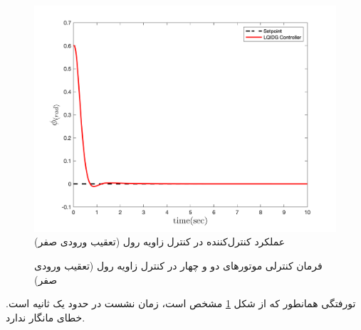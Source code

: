 \begin{figure}[H]
	\includegraphics[width=.48\linewidth]{../Figures/MIL/LQIDG/Roll/lqidg_rollnn_.png}
	\centering
	\caption{عملكرد کنترل‌کننده  در کنترل زاويه رول (تعقیب ورودی صفر)}
	\label{lqidg_roll_fig_simulation}
\end{figure}
\begin{figure}[H]
	\centering
	\caption{‫‪فرمان کنترلی موتورهای دو و چهار در کنترل زاویه رول (تعقیب ورودی صفر)}
\end{figure}

‌تورفتگی همانطور که از شکل
\ref{lqidg_roll_fig_simulation}
مشخص است، زمان نشست در حدود یک ثانیه است. خطای مانگار ندارد.